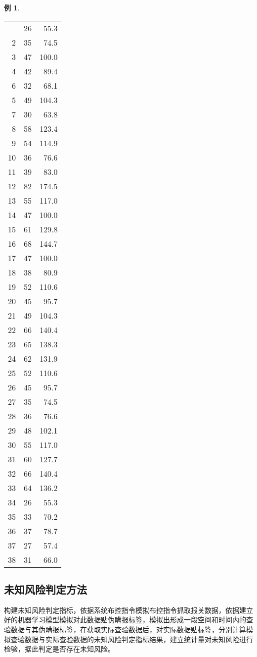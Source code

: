 \documentclass[a4paper]{tufte-book}%
\theoremstyle{definition}
\theoremstyle{definition}
\newtheorem{Example}{\hspace{2em}例}[section]
\begin{document}
\begin{Example}
\begin{center}
\begin{longtable}{r|r|r}
			\hline \hline
			\endlastfoot
			1&26&55.3\\
			2&35&74.5\\
			3&47&100.0\\
			4&42&89.4\\
			6&32&68.1\\
			5&49&104.3\\
			7&30&63.8\\
			8&58&123.4\\
			9&54&114.9\\
			10&36&76.6\\
			11&39&83.0\\
			12&82&174.5\\
			13&55&117.0\\
			14&47&100.0\\
			15&61&129.8\\
			16&68&144.7\\
			17&47&100.0\\
			18&38&80.9\\
			19&52&110.6\\
			20&45&95.7\\
			21&49&104.3\\
			22&66&140.4\\
			23&65&138.3\\
			24&62&131.9\\
			25&52&110.6\\
			26&45&95.7\\
			27&35&74.5\\
			28&36&76.6\\
			29&48&102.1\\
			30&55&117.0\\
			31&60&127.7\\
			32&66&140.4\\
			33&64&136.2\\
			34&26&55.3\\
			35&33&70.2\\
			36&37&78.7\\
			37&27&57.4\\
			38&31&66.0\\
		\end{longtable}
	\end{center}
\end{Example}

\subsection{未知风险判定方法}
构建未知风险判定指标，依据系统布控指令模拟布控指令抓取报关数据，依据建立好的机器学习模型模拟对此数据贴伪瞒报标签，模拟出形成一段空间和时间内的查验数据与其伪瞒报标签，在获取实际查验数据后，对实际数据贴标签，分别计算模拟查验数据与实际查验数据的未知风险判定指标结果，建立统计量对未知风险进行检验，据此判定是否存在未知风险。
\end{document}
